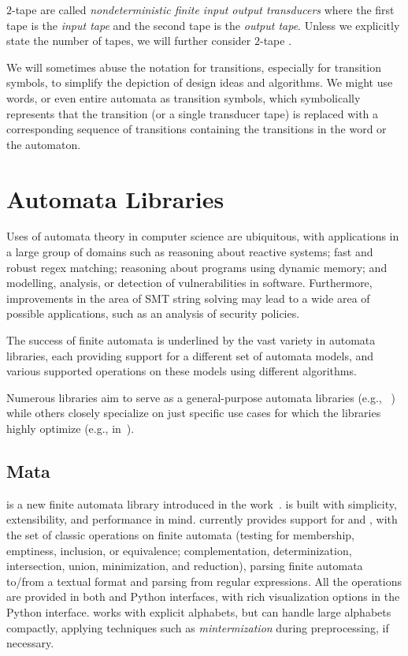 $2$-tape \nfts are called \emph{nondeterministic finite input output transducers} where the first tape is the \emph{input tape} and the second tape is the \emph{output tape}.
Unless we explicitly state the number of tapes, we will further consider $2$-tape \nfts.

We will sometimes abuse the notation for transitions, especially for transition symbols, to simplify the depiction of design ideas and algorithms.
We might use words, or even entire automata as transition symbols, which symbolically represents that the transition (or a single transducer tape) is replaced with a corresponding sequence of transitions containing the transitions in the word or the automaton.

\chapter{Automata Libraries}
\label{chap:finite_automata}

Uses of automata theory in computer science are ubiquitous, with applications in a large group of domains such as reasoning about reactive systems; fast and robust regex matching; reasoning about programs using dynamic memory; and modelling, analysis, or detection of vulnerabilities in software.
Furthermore, improvements in the area of SMT string solving may lead to a wide area of possible applications, such as an analysis of security policies.

The success of finite automata is underlined by the vast variety in automata libraries, each providing support for a different set of automata models, and various supported operations on these models using different algorithms.

Numerous libraries aim to serve as a general-purpose automata libraries (e.g., ~\cite{automatanet, tacas24_mata_10.1007/978-3-031-57249-4_7,fado}) while others closely specialize on just specific use cases for which the libraries highly optimize (e.g., in~\cite{mona,automatajar}).

\section{Mata}

\mata is a new finite automata library introduced in the work~\cite{tacas24_mata_10.1007/978-3-031-57249-4_7}.
\mata is built with simplicity, extensibility, and performance in mind.
\mata currently provides support for \dfas and \nfas, with the set of classic operations on finite automata (testing for membership, emptiness, inclusion, or equivalence; complementation, determinization, intersection, union, minimization, and reduction),
parsing finite automata to/from a textual format and parsing \nfas from regular expressions.
All the operations are provided in both \cpp and Python interfaces, with rich visualization options in the Python interface.
\mata works with explicit alphabets, but can handle large alphabets compactly, applying techniques such as \emph{mintermization} during preprocessing, if necessary.


